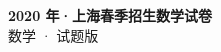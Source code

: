 \documentclass[zihao=-4, a4paper]{ctexart}
\begin{document}
\begin{center}
  {\Large\bfseries 2020 年·上海春季招生数学试卷}\\[4pt]
  {\large 数学 · 试题版}
\end{center}
\medskip
{}

\end{document}
